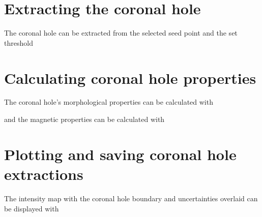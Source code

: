 \documentclass[letterpaper,10pt,english]{sphinxmanual}
\begin{document}
\section{Extracting the coronal hole}
\label{\detokenize{getting_started:extracting-the-coronal-hole}}
\sphinxAtStartPar
The coronal hole can be extracted from the selected seed point and the set threshold

\begin{sphinxVerbatim}[commandchars=\\\{\}]
\end{sphinxVerbatim}


\section{Calculating coronal hole properties}
\label{\detokenize{getting_started:calculating-coronal-hole-properties}}
\sphinxAtStartPar
The coronal hole’s morphological properties can be calculated with

\begin{sphinxVerbatim}[commandchars=\\\{\}]
\end{sphinxVerbatim}

\sphinxAtStartPar
and the magnetic properties can be calculated with

\begin{sphinxVerbatim}[commandchars=\\\{\}]
\end{sphinxVerbatim}


\section{Plotting and saving coronal hole extractions}
\label{\detokenize{getting_started:plotting-and-saving-coronal-hole-extractions}}
\sphinxAtStartPar
The intensity map with the coronal hole boundary and uncertainties overlaid can be displayed with

\begin{sphinxVerbatim}[commandchars=\\\{\}]
\end{sphinxVerbatim}
\end{document}
